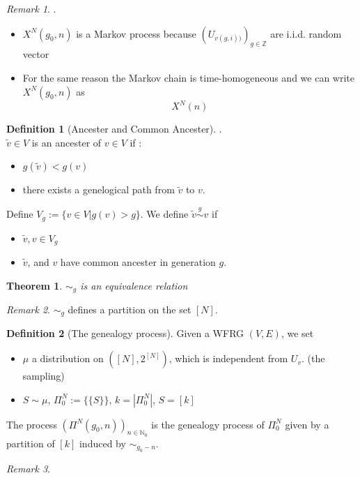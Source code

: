 \documentclass[a4paper,11pt]{book}
\newtheorem{theorem}{Theorem}[section]
\theoremstyle{definition}
\newtheorem{definition}{Definition}[section]
\theoremstyle{remark}
\newtheorem*{remark}{Remark}
\begin{document}
\begin{remark}.
\begin{itemize}
	\item $X^N(g_0, n)$ is a Markov process because $(U_{v(g, i))})_{g \in \mathbb{Z}}$ are i.i.d. random vector
	\item For the same reason the Markov chain is time-homogeneous and we can write $X^N(g_0, n)$ as
	\begin{equation*}
		X^N(n)
	\end{equation*}
\end{itemize}
\end{remark}

\begin{definition}[Ancester and Common Ancester].\\
	$\tilde{v} \in V$ is an ancester of $v \in V$ if : 
	\begin{itemize}
		\item $g(\tilde{v}) < g(v)$
		\item there exists a genelogical path from $\tilde{v}$ to $v$.
	\end{itemize}
	Define $V_g:= \{v \in V| g(v) > g\}$. We define $\tilde{v} \overset{g}{\sim} v $ if 
	\begin{itemize}
		\item $\tilde{v}, v \in V_g$
		\item $\tilde{v}$, and $v$ have common ancester in generation $g$.
	\end{itemize}
\end{definition}

\begin{theorem}
	$\sim_g$ is an equivalence relation
\end{theorem}
\begin{remark}
$\sim_g$ defines a partition on the set $[N]$.	
\end{remark}

\begin{definition}[The genealogy process]
	Given a WFRG $(V, E)$, we set
	\begin{itemize}
		\item $\mu$ a distribution on $([N], 2^{[N]})$, which is independent from $U_v$. (the sampling)
		\item $S \sim \mu$, $\Pi_0^N := \{\{S\}\}$, $k = | \Pi_0^N|$, $S = [k]$
	\end{itemize}
	The process $(\Pi^N(g_0, n))_{n \in \mathbb{N}_0}$ is the genealogy process of $\Pi^N_0$ given by a partition of $[k]$ induced by $\sim_{g_0 -n}$.
\end{definition}
\begin{remark}
\end{remark}
\end{document}
